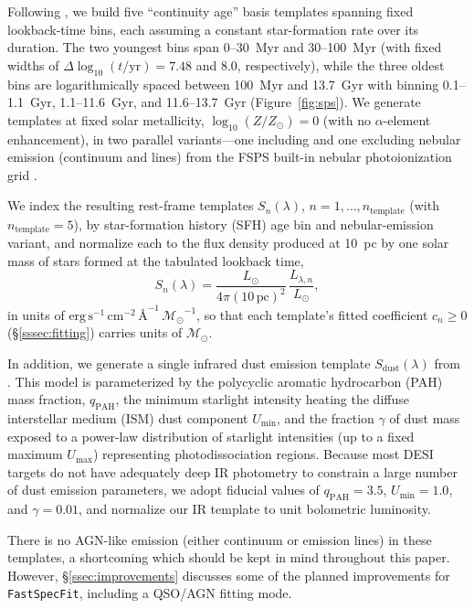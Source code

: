 \documentclass[modern,linenumbers]{aastex701}
\newcommand{\fastspecfit}{\texttt{FastSpecFit}}
\newcommand{\msun}{\ensuremath{\mathcal{M}_{\odot}}}
\begin{document}
Following \citet{leja17a}, we build five ``continuity age'' basis
templates spanning fixed lookback-time bins, each assuming a constant
star-formation rate over its duration. The two youngest bins span
0--30~Myr and 30--100~Myr (with fixed widths of
$\Delta\log_{10}(t/\mathrm{yr}) = 7.48$ and $8.0$, respectively),
while the three oldest bins are logarithmically spaced between 100~Myr
and 13.7~Gyr with binning 0.1--1.1~Gyr, 1.1--11.6~Gyr, and
11.6--13.7~Gyr (Figure~\ref{fig:sps}). We generate templates at fixed
solar metallicity, $\log_{10}(Z/Z_\odot) = 0$ (with no
$\alpha$-element enhancement), in two parallel variants---one
including and one excluding nebular emission (continuum and lines)
from the FSPS built-in nebular photoionization grid \citep{byler17a}.

We index the resulting rest-frame templates $S_n(\lambda)$, $n =
1,\ldots,n_\mathrm{template}$ (with $n_\mathrm{template}=5$), by
star-formation history (SFH) age bin and nebular-emission variant, and
normalize each to the flux density produced at 10~pc by one solar mass
of stars formed at the tabulated lookback time,
\begin{equation}
  S_n(\lambda) =
  \frac{L_\odot}{4\pi(10\,\mathrm{pc})^2}\,\frac{L_{\lambda,n}}{L_\odot},
  \label{eq:fnorm}
\end{equation}
in units of
$\mathrm{erg\,s^{-1}\,cm^{-2}\,\text{\AA}^{-1}\,\msun^{-1}}$, so that
each template's fitted coefficient $c_n \geq 0$
(\S\ref{sssec:fitting}) carries units of \msun.

In addition, we generate a single infrared dust emission template
$S_\mathrm{dust}(\lambda)$ from \citet{draine07a}. This model is
parameterized by the polycyclic aromatic hydrocarbon (PAH) mass
fraction, $q_\mathrm{PAH}$, the minimum starlight intensity heating
the diffuse interstellar medium (ISM) dust component $U_\mathrm{min}$,
and the fraction $\gamma$ of dust mass exposed to a power-law
distribution of starlight intensities (up to a fixed maximum
$U_\mathrm{max}$) representing photodissociation regions. Because most
DESI targets do not have adequately deep IR photometry to constrain a
large number of dust emission parameters, we adopt fiducial values of
$q_\mathrm{PAH} = 3.5$, $U_\mathrm{min} = 1.0$, and $\gamma = 0.01$,
and normalize our IR template to unit bolometric luminosity.

There is no AGN-like emission (either continuum or emission lines) in
these templates, a shortcoming which should be kept in mind throughout
this paper. However, \S\ref{ssec:improvements} discusses some of the
planned improvements for \fastspecfit{}, including a QSO/AGN fitting
mode.
\end{document}
